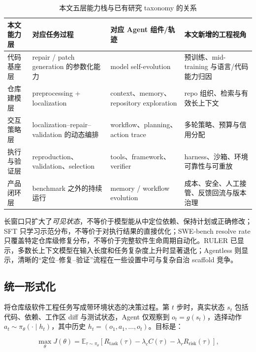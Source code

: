 \documentclass[10pt,a4paper,UTF8,fontset=none]{ctexart}
\begin{document}
\begin{table}[htbp]
\centering
\caption{本文五层能力栈与已有研究 taxonomy 的关系}
\label{zh:tab:taxonomy-map}
\small
\begin{tabularx}{\textwidth}{p{2.5cm}YYY}
\toprule
本文能力层 & 对应任务过程 & 对应 Agent 组件/轨迹 & 本文新增的工程视角 \\
\midrule
代码基座层 & repair / patch generation 的参数化能力 & model self-evolution & 预训练、mid-training 与语言/代码能力归因 \\
仓库建模层 & preprocessing + localization & context、memory、repository exploration & repo 组织、检索与有效长上下文 \\
交互策略层 & localization--repair--validation 的动态编排 & workflow、planning、action trace & 多轮策略、预算与信用分配 \\
执行与验证层 & reproduction、validation、selection & tools、framework、verifier & harness、沙箱、环境可靠性与可重放 \\
产品闭环层 & benchmark 之外的持续运行 & memory / workflow evolution & 成本、安全、人工接管、反馈回流与版本治理 \\
\bottomrule
\end{tabularx}
\end{table}

\begin{keybox}[能力边界]
长窗口只扩大了\emph{可见状态}，不等价于模型能从中定位依赖、保持计划或正确修改；SFT 只学习示范分布，不等价于对执行结果的直接优化；SWE-bench resolve rate 只覆盖特定仓库级修复分布，不等价于完整软件生命周期自动化。RULER 已显示，多数长上下文模型在输入长度和任务复杂度上升时显著退化\cite{zh:hsieh2024ruler}；Agentless 则显示，清晰的“定位--修复--验证”流程在一些设置中可与复杂自治 scaffold 竞争\cite{zh:xia2024agentless}。
\end{keybox}

\subsection{统一形式化}

将仓库级软件工程任务写成带环境状态的决策过程。第 $t$ 步时，真实状态 $s_t$ 包括代码、依赖、工作区 diff 与测试状态，Agent 仅观察到 $o_t=g(s_t)$，选择动作 $a_t\sim\pi_\theta(\cdot\mid h_t)$，其中历史 $h_t=(o_1,a_1,\ldots,o_t)$。目标是：

\begin{equation}
\max_\theta J(\theta)=\mathbb{E}_{\tau\sim\pi_\theta}\left[R_{\mathrm{task}}(\tau)-\lambda_c C(\tau)-\lambda_r R_{\mathrm{risk}}(\tau)\right],
\label{zh:eq:agent-objective}
\end{equation}
\end{document}
